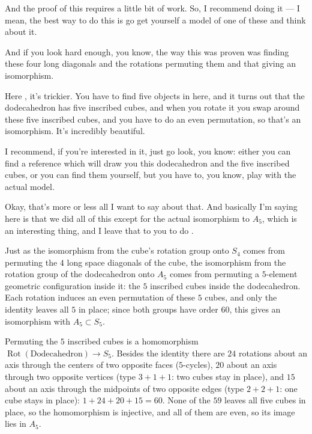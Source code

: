 \begin{speech}[00:24:15 - 00:25:16]
And the proof of this requires a little bit of work. So, I recommend doing it --- I mean, the best way to do this is go get yourself a model of one of these and think about it.

And if you look hard enough, you know, the way this was proven  was finding these four long diagonals and the rotations permuting them and that giving an isomorphism.

Here , it's trickier. You have to find five objects in here, and it turns out that the dodecahedron has five inscribed cubes, and when you rotate it you swap around these five inscribed cubes, and you have to do an even permutation, so that's an isomorphism. It's incredibly beautiful.

I recommend, if you're interested in it, just go look, you know: either you can find a reference which will draw you this dodecahedron and the five inscribed cubes, or you can find them yourself, but you have to, you know, play with the actual model.

Okay, that's more or less all I want to say about that. And basically I'm saying here is that we did all of this except for the actual isomorphism to $A_5$, which is an interesting thing, and I leave that to you to do .
\end{speech}

\begin{insight}
Just as the isomorphism from the cube's rotation group onto $S_4$ comes from permuting the $4$ long space diagonals of the cube, the isomorphism from the rotation group of the dodecahedron onto $A_5$ comes from permuting a $5$-element geometric configuration inside it: the $5$ inscribed cubes inside the dodecahedron. Each rotation induces an even permutation of these $5$ cubes, and only the identity leaves all $5$ in place; since both groups have order $60$, this gives an isomorphism with $A_5 \subset S_5$.
\end{insight}

\begin{aiNote}
Permuting the $5$ inscribed cubes is a homomorphism $\operatorname{Rot}(\text{Dodecahedron}) \to S_5$. Besides the identity there are $24$ rotations about an axis through the centers of two opposite faces ($5$-cycles), $20$ about an axis through two opposite vertices (type $3+1+1$: two cubes stay in place), and $15$ about an axis through the midpoints of two opposite edges (type $2+2+1$: one cube stays in place): $1 + 24 + 20 + 15 = 60$. None of the $59$ leaves all five cubes in place, so the homomorphism is injective, and all of them are even, so its image lies in $A_5$.
\end{aiNote}

